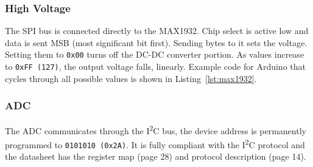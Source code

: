 \subsubsection{High Voltage}
The SPI bus is connected directly to the MAX1932. Chip select is active low and data is sent MSB (most significant bit first). Sending bytes to it sets the voltage. Setting them to \texttt{0x00} turns off the DC-DC converter portion. As values increase to \texttt{0xFF (127)}, the output voltage falls, linearly. Example code for Arduino that cycles through all possible values is shown in Listing~\ref{lst:max1932}.



\subsubsection{ADC}
The ADC communicates through the I\textsuperscript{2}C bus, the device address is permanently programmed to \texttt{0101010 (0x2A)}. It is fully compliant with the I\textsuperscript{2}C protocol and the datasheet has the register map (page 28) and protocol description (page 14).




\begin{landscape}


\end{landscape}

